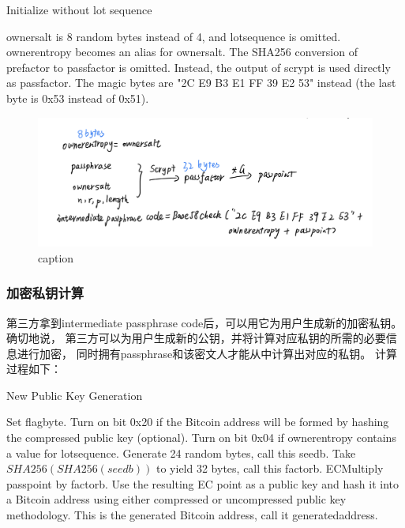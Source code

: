 \begin{algorithm}[tbp]\footnotesize
\caption{Initialize without lot sequence}
  	\begin{algorithmic}[1]
	    \STATE ownersalt is 8 random bytes instead of 4, and lotsequence is omitted. ownerentropy becomes an alias for ownersalt. 
		\STATE The SHA256 conversion of prefactor to passfactor is omitted. Instead, the output of scrypt is used directly as passfactor.
		\STATE The magic bytes are "2C E9 B3 E1 FF 39 E2 53" instead (the last byte is 0x53 instead of 0x51). 
    \end{algorithmic}
\end{algorithm}



\begin{figure}[h]
\centering
\includegraphics[width=.7\textwidth]{./im-code2.png}
\caption{caption}\label{fig-parsesig}
\end{figure}

\subsubsection{加密私钥计算}
第三方拿到intermediate passphrase code后，可以用它为用户生成新的加密私钥。确切地说，
第三方可以为用户生成新的公钥，并将计算对应私钥的所需的必要信息进行加密，
同时拥有passphrase和该密文人才能从中计算出对应的私钥。  
计算过程如下：


\begin{algorithm}[tbp]\footnotesize
\caption{New Public Key Generation}
  	\begin{algorithmic}[1]
	    \STATE Set flagbyte.
	    \STATE Turn on bit 0x20 if the Bitcoin address will be formed 
	    by hashing the compressed public key (optional). Turn on bit 0x04 
	    if ownerentropy contains a value for lotsequence.   
		\STATE Generate 24 random bytes, call this seedb. 
		Take $SHA256(SHA256(seedb))$ to yield 32 bytes, call this factorb.
		\STATE ECMultiply passpoint by factorb. Use the resulting EC point 
		as a public key and hash it into a Bitcoin address using either 
		compressed or uncompressed public key methodology. 
		This is the generated Bitcoin address, call it generatedaddress. 
    \end{algorithmic}
\end{algorithm}

